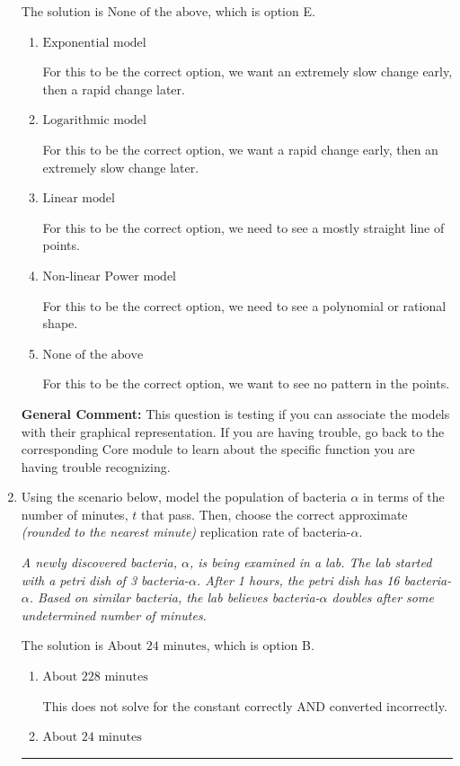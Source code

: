 \documentclass{extbook}[14pt]
\newcommand{\litem}[1]{\item #1

\rule{\textwidth}{0.4pt}}
\begin{document}
\begin{enumerate}
{The solution is \( \text{None of the above} \), which is option E.\begin{enumerate}[label=\Alph*.]
\item \( \text{Exponential model} \)

For this to be the correct option, we want an extremely slow change early, then a rapid change later.
\item \( \text{Logarithmic model} \)

For this to be the correct option, we want a rapid change early, then an extremely slow change later.
\item \( \text{Linear model} \)

For this to be the correct option, we need to see a mostly straight line of points.
\item \( \text{Non-linear Power model} \)

For this to be the correct option, we need to see a polynomial or rational shape.
\item \( \text{None of the above} \)

For this to be the correct option, we want to see no pattern in the points.
\end{enumerate}

\textbf{General Comment:} This question is testing if you can associate the models with their graphical representation. If you are having trouble, go back to the corresponding Core module to learn about the specific function you are having trouble recognizing.
}
\litem{
Using the scenario below, model the population of bacteria $\alpha$ in terms of the number of minutes, $t$ that pass. Then, choose the correct approximate \textit{(rounded to the nearest minute)} replication rate of bacteria-$\alpha$.

\begin{center}
    \textit{ A newly discovered bacteria, $\alpha$, is being examined in a lab. The lab started with a petri dish of 3 bacteria-$\alpha$. After 1 hours, the petri dish has 16 bacteria-$\alpha$. Based on similar bacteria, the lab believes bacteria-$\alpha$ doubles after some undetermined number of minutes. }
\end{center}


The solution is \( \text{About } 24 \text{ minutes} \), which is option B.\begin{enumerate}[label=\Alph*.]
\item \( \text{About } 228 \text{ minutes} \)

This does not solve for the constant correctly AND converted incorrectly.
\item \( \text{About } 24 \text{ minutes} \)


\end{enumerate}}
\end{enumerate}
\end{document}
